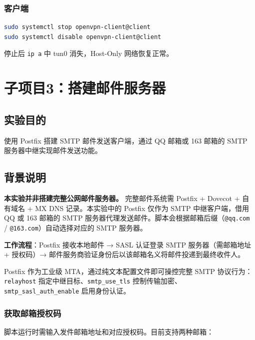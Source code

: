 \documentclass[12pt,a4paper]{ctexart}
\begin{document}
\subsubsection{客户端}

\begin{cmdbox}
\begin{lstlisting}[language=bash]
sudo systemctl stop openvpn-client@client
sudo systemctl disable openvpn-client@client
\end{lstlisting}
\end{cmdbox}

停止后 \texttt{ip a} 中 tun0 消失，Host-Only 网络恢复正常。

\newpage
\section{子项目3：搭建邮件服务器}

\subsection{实验目的}

使用 Postfix 搭建 SMTP 邮件发送客户端，通过 QQ 邮箱或 163 邮箱的 SMTP 服务器中继实现邮件发送功能。

\subsection{背景说明}

\textbf{本实验并非搭建完整公网邮件服务器。} 完整邮件系统需 Postfix + Dovecot + 自有域名 + MX DNS 记录。本实验中的 Postfix 仅作为 SMTP 中继客户端，借用 QQ 或 163 邮箱的 SMTP 服务器代理发送邮件。脚本会根据邮箱后缀（\texttt{@qq.com} / \texttt{@163.com}）自动选择对应的 SMTP 服务器。

\textbf{工作流程}：Postfix 接收本地邮件 → SASL 认证登录 SMTP 服务器（需邮箱地址 + 授权码）→ 邮件服务商验证身份后以该邮箱名义将邮件投递到最终收件人。

Postfix 作为工业级 MTA，通过纯文本配置文件即可操控完整 SMTP 协议行为：\texttt{relayhost} 指定中继目标、\texttt{smtp\_use\_tls} 控制传输加密、\texttt{smtp\_sasl\_auth\_enable} 启用身份认证。

\subsubsection{获取邮箱授权码}

脚本运行时需输入发件邮箱地址和对应授权码。目前支持两种邮箱：
\end{document}
